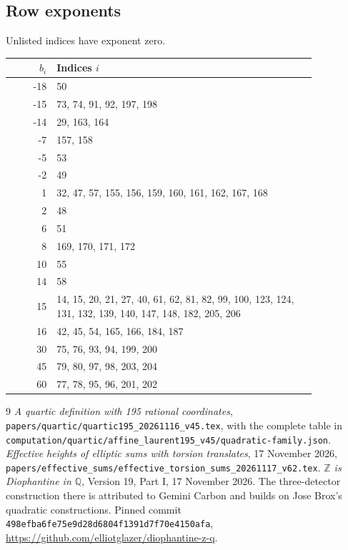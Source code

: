 \documentclass[11pt,a4paper]{article}
\newcommand{\Q}{\mathbb Q}\newcommand{\Z}{\mathbb Z}
\begin{document}
\subsection*{Row exponents}
Unlisted indices have exponent zero.
\begin{longtable}{r p{0.85\linewidth}}
\toprule
$b_i$ & Indices $i$\\
\midrule
\endhead
-18 & 50\\
-15 & 73, 74, 91, 92, 197, 198\\
-14 & 29, 163, 164\\
-7 & 157, 158\\
-5 & 53\\
-2 & 49\\
1 & 32, 47, 57, 155, 156, 159, 160, 161, 162, 167, 168\\
2 & 48\\
6 & 51\\
8 & 169, 170, 171, 172\\
10 & 55\\
14 & 58\\
15 & 14, 15, 20, 21, 27, 40, 61, 62, 81, 82, 99, 100, 123, 124, 131, 132, 139, 140, 147, 148, 182, 205, 206\\
16 & 42, 45, 54, 165, 166, 184, 187\\
30 & 75, 76, 93, 94, 199, 200\\
45 & 79, 80, 97, 98, 203, 204\\
60 & 77, 78, 95, 96, 201, 202\\
\bottomrule
\end{longtable}

\begin{thebibliography}{9}
\emph{A quartic definition with 195 rational coordinates},
\nolinkurl{papers/quartic/quartic195_20261116_v45.tex},
with the complete table in
\nolinkurl{computation/quartic/affine_laurent195_v45/quadratic-family.json}.
\emph{Effective heights of elliptic sums with torsion translates},
17 November 2026,
\nolinkurl{papers/effective_sums/effective_torsion_sums_20261117_v62.tex}.
\emph{$\Z$ is Diophantine in $\Q$}, Version 19, Part I,
17 November 2026. The three-detector construction there is attributed
to Gemini Carbon and builds on Jose Brox's quadratic constructions.
Pinned commit
\texttt{498efba6fe75e9d28d6804f1391d7f70e4150afa},
\url{https://github.com/elliotglazer/diophantine-z-q}.
\end{thebibliography}
\end{document}
